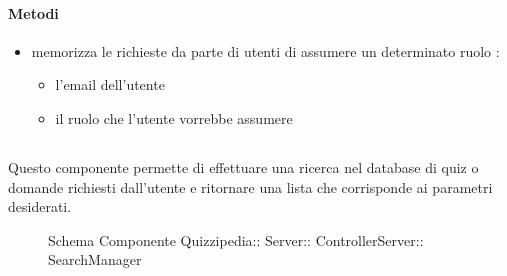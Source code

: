 \paragraph{Metodi}
\begin{itemize}
\item {}
\newline
memorizza le richieste da parte di utenti di assumere un determinato ruolo
\newline
{} :
\begin{itemize}
\item {}
\newline
l'email dell'utente
\item {}
\newline
il ruolo che l'utente vorrebbe assumere
\end{itemize}
\end{itemize}
\subsection{}
Questo componente permette di effettuare una ricerca nel database di quiz o domande richiesti dall'utente e ritornare una lista che corrisponde ai parametri desiderati.
\begin{figure}[H]
\centering
\noindent{}
\caption[Schema Componente Quizzipedia::Server::ControllerServer::SearchManager]{Schema Componente Quizzipedia:: Server:: ControllerServer:: SearchManager}
\end{figure}
